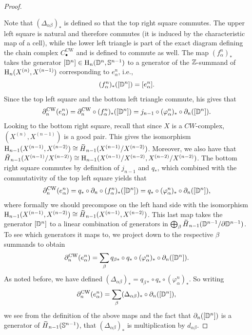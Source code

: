 \begin{proof}
\begin{enumerate}
    \end{enumerate}
    Note that $(\Delta_{\alpha\beta})_\ast$ is defined so that the top right square commutes. The upper left square is natural and therefore commutes (it is induced by the characteristic map of a cell), while the lower left triangle is part of the exact diagram defining the chain complex $C_\bullet^{\mathrm{CW}}$ and is defined to commute as well. The map $(f_\alpha^n)_\ast$ takes the generator $[\mathbb{D}^n]\in \mathrm{H}_n(\mathbb{D}^n,\mathbb{S}^{n-1})$ to a generator of the $\mathbb{Z}$-summand of $\mathrm{H}_n(X^{(n)},X^{(n-1)})$ corresponding to $e^n_\alpha$, i.e., 
    \[(f^n_\alpha)_\ast([\mathbb{D}^n])=[e^n_\alpha].\]
    Since the top left square and the bottom left triangle commute, his gives that 
    \[\partial_n^{\mathrm{CW}}(e^n_\alpha)=\partial_n^{\mathrm{CW}}\circ (f^n_\alpha)_\ast([\mathbb{D}^n])=j_{n-1}\circ (\varphi_\alpha^n)_\ast\circ \partial_n([\mathbb{D}^n]).\]
    Looking to the bottom right square, recall that since $X$ is a $CW$-complex, $(X^{(n)},X^{(n-1)})$ is a good pair. This gives the isomorphism $\rmH_{n-1}(X^{(n-1)},X^{(n-2)})\cong \wt{H}_{n-1}(X^{(n-1)}\slash X^{(n-2)})$. Moreover, we also have that $\wt{H}_{n-1}(X^{(n-1)}\slash X^{(n-2)})\cong \rmH_{n-1}(X^{(n-1)}\slash X^{(n-2)},X^{(n-2)}\slash\allowbreak X^{(n-2)})$. The bottom right square commutes by definition of $j_{n-1}$ and $q_\ast$, which combined with the commutativity of the top left square yields that
    \[\partial_n^{\mathrm{CW}}(e^n_\alpha)=q_\ast\circ \partial_n\circ (f_\alpha^n)_\ast([\mathbb{D}^n])=q_\ast\circ (\varphi^n_\alpha)_\ast\circ \partial_n([\mathbb{D}^n]),\]
    where formally we should precompose on the left hand side with the isomorphism $\rmH_{n-1}(X^{(n-1)},\allowbreak X^{(n-2)})\cong \wt{H}_{n-1}(X^{(n-1)},X^{(n-2)})$. This last map takes the generator $[\mathbb{D}^n]$ to a linear combination of generators in $\bigoplus_\beta \wt{H}_{n-1}(\bbD^{n-1}\slash \partial \bbD^{n-1})$. To see which generators it maps to, we project down to the respective $\beta$ summands to obtain
    \[\partial_n^{\mathrm{CW}}(e^n_\alpha)=\sum_\beta q_{\beta\ast}\circ q_\ast\circ (\varphi^n_\alpha)_\ast\circ \partial_n([\mathbb{D}^n]).\]
    As noted before, we have defined $(\Delta_{\alpha\beta})_\ast=q_{\beta\ast}\circ q_\ast\circ (\varphi^n_\alpha)_\ast$. So writing
    \[\partial_n^{\mathrm{CW}}(e^n_\alpha)=\sum_\beta (\Delta_{\alpha\beta})_\ast \circ \partial_n([\mathbb{D}^n]),\]
    we see from the definition of the above maps and the fact that $\partial_n([\mathbb{D}^n])$ is a generator of $\wt{H}_{n-1}(\bbS^{n-1})$, that $(\Delta_{\alpha\beta})_\ast$ is multiplication by $d_{\alpha\beta}$.
\end{proof}


